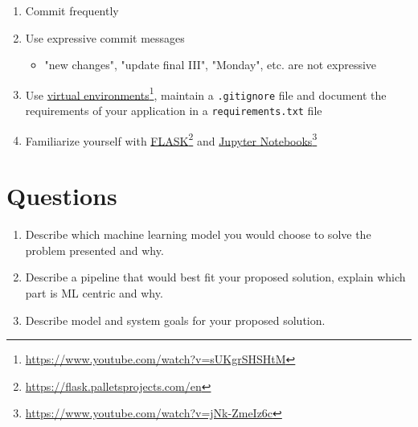 \begin{enumerate}
      \item Commit frequently
      \item Use expressive commit messages
            \begin{itemize}
                  \item "new changes", "update final III", "Monday", etc. are not expressive
            \end{itemize}
      \item
            Use \href{https://www.youtube.com/watch?v=sUKgrSHSHtM}{virtual environments}\footnote{\url{https://www.youtube.com/watch?v=sUKgrSHSHtM}}, maintain a \texttt{.gitignore} file and document the requirements of your application in a \texttt{requirements.txt} file
      \item
            Familiarize yourself with \href{https://flask.palletsprojects.com/en}{FLASK}\footnote{\url{https://flask.palletsprojects.com/en}} and \href{https://www.youtube.com/watch?v=jNk-ZmeIz6c}{Jupyter Notebooks}\footnote{\url{https://www.youtube.com/watch?v=jNk-ZmeIz6c}}
\end{enumerate}

\newpage

\section*{Questions}

\begin{enumerate}
      \item
            Describe which machine learning model you would choose to solve the problem presented and why.

      \item
            Describe a pipeline that would best fit your proposed solution, explain which part is ML centric and why.

      \item
            Describe model and system goals for your proposed solution.
\end{enumerate}



